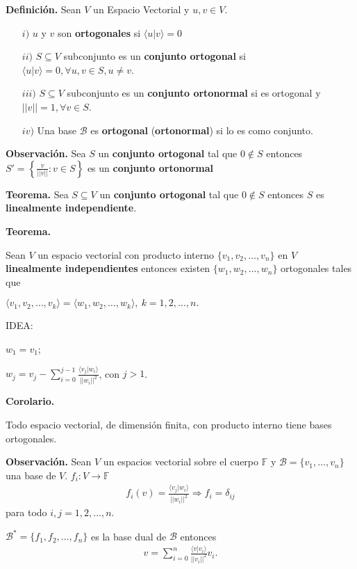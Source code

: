 \newpage


\textbf{Definición.} Sean $V$ un Espacio Vectorial y $u, v \in V$.

\begin{itemize}
    \item[$i)$] $u$ y $v$ son \textbf{ortogonales} si $\langle u|v \rangle = 0$
    \item[$ii)$] $S \subseteq V$ subconjunto es un \textbf{conjunto ortogonal} si
                 $\langle u|v \rangle = 0, \forall u, v \in S, u \not = v$.
    \item[$iii)$] $S \subseteq V$ subconjunto es un \textbf{conjunto ortonormal} si 
                 es ortogonal y $||v|| = 1, \forall v \in S$.
    \item[$iv)$] Una base $\mathcal{B}$ es \textbf{ortogonal} (\textbf{ortonormal})
                 si lo es como conjunto.
\end{itemize}

\textbf{Observación.} Sea $S$ un \textbf{conjunto ortogonal} tal que $0 \not\in S$ entonces
$S'=\left\{ \frac{v}{||v||}:v \in S \right\}$ es un \textbf{conjunto ortonormal} 

\textbf{Teorema.} Sea $S \subseteq V$ un \textbf{conjunto ortogonal}
tal que $0 \not\in S$ entonces $S$ es \textbf{linealmente independiente}.

\textbf{Teorema.}

Sean $V$ un espacio vectorial con producto interno $\{v_{1},
v_{2}, \dots, v_{n}\}$ en $V$ \textbf{linealmente independientes}
entonces existen $\{w_{1}, w_{2}, \dots, w_{n}\}$ ortogonales tales que

$\langle v_{1}, v_{2}, \dots, v_{k} \rangle=\langle w_{1}, w_{2}, \dots, w_{k} \rangle,~k=1,2,\dots, n.$

IDEA:

$w_{1}=v_{1}$;

$w_{j}=v_{j}-\displaystyle{\sum_{i=0}^{j-1}}\frac{\langle v_{j}|w_{i} \rangle}{||w_{i}||^2}$, con $j>1$.

\textbf{Corolario.}

Todo espacio vectorial, de dimensión finita, con producto interno tiene bases
ortogonales.

\textbf{Observación.} Sean $V$ un espacios vectorial sobre el 
cuerpo $\mathbb{F}$ y $\mathcal{B}=\{v_{1},\dots,v_{n}\}$ una base de $V$.
$f_{i}:V\to \mathbb{F}$
\begin{align*}
	f_{i}(v) = \frac{\langle v_{j}|w_{i} \rangle}{||w_{i}||^2}
	\Rightarrow f_{i}=\delta_{ij}
\end{align*}
para todo $i, j = 1, 2, \dots, n$.

$\mathcal{B}^{\ast}=\{f_{1}, f_{2}, \dots, f_{n}\}$ es la base dual de $\mathcal{B}$
entonces 
\begin{align*}
	v=\displaystyle{\sum_{i=0}^{n}} \frac{\langle v|v_{i} \rangle}{||v_{i}||^2}v_{i}.
\end{align*}
